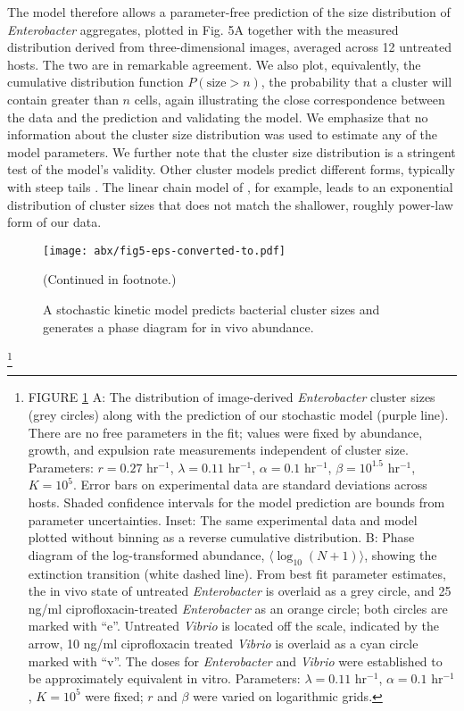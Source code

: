 The model therefore allows a parameter-free prediction of the size distribution of \textit{Enterobacter} aggregates, plotted in Fig. 5A together with the measured distribution derived from three-dimensional images, averaged across 12 untreated hosts. The two are in remarkable agreement. We also plot, equivalently, the cumulative distribution function $P(\text{size} > n)$, the probability that a cluster will contain greater than $n$ cells, again illustrating the close correspondence between the data and the prediction and validating the model. We emphasize that no information about the cluster size distribution was used to estimate any of the model parameters. We further note that the cluster size distribution is a stringent test of the model's validity. Other cluster models predict different forms, typically with steep tails \cite{krapivsky1996transitional,bansept2019enchained}. The linear chain model of \cite{bansept2019enchained}, for example, leads to an exponential distribution of cluster sizes that does not match the shallower, roughly power-law form of our data.


\begin{figure}%
\centerline{
	\texttt{[image: abx/fig5-eps-converted-to.pdf]}}
	\caption{A stochastic kinetic model predicts bacterial cluster sizes and generates a phase diagram for in vivo abundance.}{(Continued in footnote.)}
	\label{fig:fig5}
\end{figure}

{\let\thefootnote\relax\footnote{FIGURE \ref{fig:fig5} A: The distribution of image-derived \textit{Enterobacter} cluster sizes (grey circles) along with the prediction of our stochastic model (purple line). There are no free parameters in the fit; values were fixed by abundance, growth, and expulsion rate measurements independent of cluster size. Parameters: $r = 0.27$ hr$^{-1}$, $\lambda = 0.11$ hr$^{-1}$, $\alpha = 0.1$ hr$^{-1}$, $\beta = 10^{1.5}$ hr$^{-1}$, $K = 10^5$. Error bars on experimental data are standard deviations across hosts. Shaded confidence intervals for the model prediction are bounds from parameter uncertainties. Inset: The same experimental data and model plotted without binning as a reverse cumulative distribution. B: Phase diagram of the log-transformed abundance, $\langle \log_{10}(N+1)\rangle$, showing the extinction transition (white dashed line). From best fit parameter estimates, the in vivo state of untreated \textit{Enterobacter} is overlaid as a grey circle, and 25 ng/ml ciprofloxacin-treated \textit{Enterobacter} as an orange circle; both circles are marked with ``e''. Untreated \textit{Vibrio} is located off the scale, indicated by the arrow, 10 ng/ml ciprofloxacin treated \textit{Vibrio} is overlaid as a cyan circle marked with ``v''. The doses for \textit{Enterobacter} and \textit{Vibrio} were established to be approximately equivalent in vitro. Parameters: $\lambda = 0.11$ hr$^{-1}$, $\alpha =  0.1$ hr$^{-1}$, $K = 10^5$ were fixed; $r$ and $\beta$ were varied on logarithmic grids.}}

